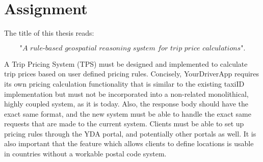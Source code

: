 %
\section{Assignment}
The title of this thesis reads:

\[\textit{"A rule-based geospatial reasoning system for trip price calculations"}.\] \hfill

A Trip Pricing System (TPS) must be designed and implemented to calculate trip prices based on user defined pricing rules. Concisely, YourDriverApp requires its own pricing calculation functionality that is similar to the existing taxiID implementation but must not be incorporated into a non-related monolithical, highly coupled system, as it is today. Also, the response body should have the exact same format, and the new system must be able to handle the exact same requests that are made to the current system. Clients must be able to set up pricing rules through the YDA portal, and potentially other portals as well. It is also important that the feature which allows clients to define locations is usable in countries without a workable postal code system.

%

